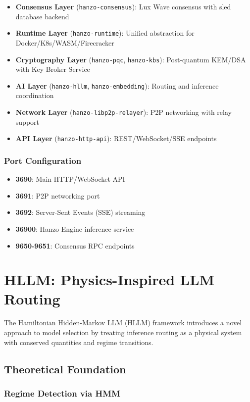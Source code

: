 \documentclass[11pt,twocolumn]{article}
\begin{document}
\begin{itemize}
\item \textbf{Consensus Layer} (\texttt{hanzo-consensus}): Lux Wave consensus with sled database backend
\item \textbf{Runtime Layer} (\texttt{hanzo-runtime}): Unified abstraction for Docker/K8s/WASM/Firecracker
\item \textbf{Cryptography Layer} (\texttt{hanzo-pqc}, \texttt{hanzo-kbs}): Post-quantum KEM/DSA with Key Broker Service
\item \textbf{AI Layer} (\texttt{hanzo-hllm}, \texttt{hanzo-embedding}): Routing and inference coordination
\item \textbf{Network Layer} (\texttt{hanzo-libp2p-relayer}): P2P networking with relay support
\item \textbf{API Layer} (\texttt{hanzo-http-api}): REST/WebSocket/SSE endpoints
\end{itemize}

\subsubsection{Port Configuration}

\begin{itemize}
\item \textbf{3690}: Main HTTP/WebSocket API
\item \textbf{3691}: P2P networking port
\item \textbf{3692}: Server-Sent Events (SSE) streaming
\item \textbf{36900}: Hanzo Engine inference service
\item \textbf{9650-9651}: Consensus RPC endpoints
\end{itemize}

\section{HLLM: Physics-Inspired LLM Routing}

The Hamiltonian Hidden-Markov LLM (HLLM) framework introduces a novel approach to model selection by treating inference routing as a physical system with conserved quantities and regime transitions.

\subsection{Theoretical Foundation}

\subsubsection{Regime Detection via HMM}
\end{document}

